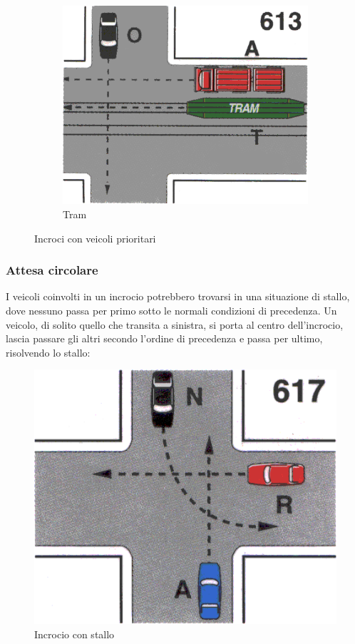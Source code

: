 \begin{figure}[htbp!]
\begin{subfigure}{.3\textwidth}
		\includegraphics[width=\textwidth]{./images/tram}
		\caption{Tram}
		\label{fig:tram}
	\end{subfigure}
	\caption{Incroci con veicoli prioritari}
	\label{fig:prior}
\end{figure}

\subsubsection{Attesa circolare}
I veicoli coinvolti in un incrocio potrebbero trovarsi in una situazione di stallo, dove nessuno passa per primo sotto le normali condizioni di precedenza. Un veicolo, di solito quello che transita a sinistra, si porta al centro dell'incrocio, lascia passare gli altri secondo l'ordine di precedenza e passa per ultimo, risolvendo lo stallo:

\begin{figure}[htb]
	\centering
	\includegraphics[width=.5\textwidth]{images/lock}
	\caption{Incrocio con stallo}
\end{figure}

